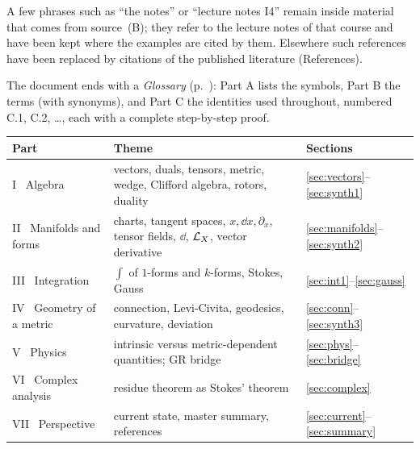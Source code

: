 A few phrases such as ``the notes'' or ``lecture notes I4'' remain inside material that comes from source~(B); they refer to the
lecture notes of that course and have been kept where the examples are cited by them. Elsewhere such references have been
replaced by citations of the published literature (References).

The document ends with a \emph{Glossary} (p.~\pageref{sec:glossary}): Part A lists the symbols, Part B the terms (with
synonyms), and Part C the identities used throughout, numbered C.1, C.2, \dots, each with a complete step-by-step proof.

\begin{center}
\small
\begin{tabular}{@{}p{4.3cm}p{6.6cm}p{3.2cm}@{}}
\toprule
\textbf{Part} & \textbf{Theme} & \textbf{Sections}\\
\midrule
I \ Algebra & vectors, duals, tensors, metric, wedge, Clifford algebra, rotors, duality & \ref{sec:vectors}--\ref{sec:synth1}\\
II \ Manifolds and forms & charts, tangent spaces, $x,\dd x,\partial_x$, tensor fields, $\dd$, $\mathcal{L}_X$, vector derivative & \ref{sec:manifolds}--\ref{sec:synth2}\\
III \ Integration & $\int$ of $1$-forms and $k$-forms, Stokes, Gauss & \ref{sec:int1}--\ref{sec:gauss}\\
IV \ Geometry of a metric & connection, Levi-Civita, geodesics, curvature, deviation & \ref{sec:conn}--\ref{sec:synth3}\\
V \ Physics & intrinsic versus metric-dependent quantities; GR bridge & \ref{sec:phys}--\ref{sec:bridge}\\
VI \ Complex analysis & residue theorem as Stokes' theorem & \ref{sec:complex}\\
VII \ Perspective & current state, master summary, references & \ref{sec:current}--\ref{sec:summary}\\
\bottomrule
\end{tabular}
\end{center}

